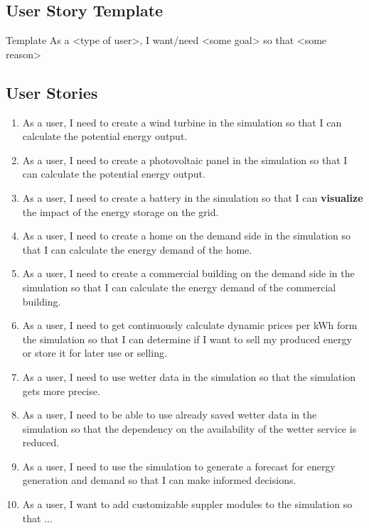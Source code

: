 \subsection{User Story Template}
Template
As a <type of user>, I want/need <some goal> so that <some reason>

\subsection{User Stories}
\begin{enumerate}
\item As a user, I need to create a wind turbine in the simulation so that I can calculate the potential energy output.

\item As a user, I need to create a photovoltaic panel in the simulation so that I can calculate the potential energy output.

\item As a user, I need to create a battery in the simulation so that I can \textbf{visualize} the impact of the energy storage on the grid.

\item As a user, I need to create a home on the demand side in the simulation so that I can calculate the energy demand of the home.

\item As a user, I need to create a commercial building on the demand side in the simulation so that I can calculate the energy demand of the commercial building.

\item As a user, I need to  get continuously calculate dynamic prices per kWh form the simulation so that I can determine if I want to sell my produced energy or store it for later use or selling.


\item As a user, I need to use wetter data in the simulation so that the simulation gets more precise.

\item As a user, I need to be able to use already saved wetter data in the simulation so that the dependency on the availability of the wetter service is reduced.

\item As a user, I need to use the simulation to generate a forecast for energy generation and demand so that I can make informed decisions.

\item As a user, I want to add customizable suppler modules to the simulation so that ...


\end{enumerate}
